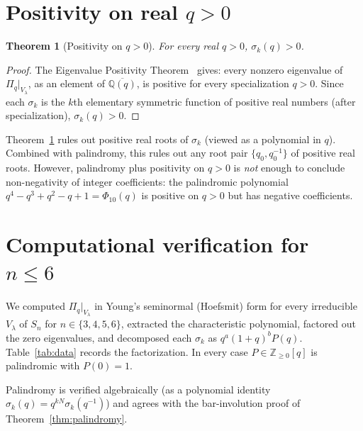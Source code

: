 \documentclass[11pt]{article}
\newtheorem{theorem}{Theorem}
\theoremstyle{definition}
\newcommand{\Pq}{\Pi_q}
\newcommand{\Z}{\mathbb{Z}}
\newcommand{\Q}{\mathbb{Q}}
\begin{document}
\section{Positivity on real \boldmath$q>0$}

\begin{theorem}[Positivity on $q>0$]\label{thm:realposivity}
For every real $q>0$, $\sigma_k(q)>0$.
\end{theorem}
\begin{proof}
The Eigenvalue Positivity Theorem~\cite{clio2026eigenvaluepositivity}
gives: every nonzero eigenvalue of $\Pq|_{V_\lambda}$, as an element of
$\overline{\Q(q)}$, is positive for every specialization $q>0$. Since
each $\sigma_k$ is the $k$th elementary symmetric function of positive
real numbers (after specialization), $\sigma_k(q)>0$.
\end{proof}

Theorem~\ref{thm:realposivity} rules out positive real roots of
$\sigma_k$ (viewed as a polynomial in $q$). Combined with palindromy,
this rules out any root pair $\{q_0, q_0^{-1}\}$ of positive real roots.
However, palindromy plus positivity on $q>0$ is \emph{not} enough to
conclude non-negativity of integer coefficients: the palindromic
polynomial $q^4-q^3+q^2-q+1=\Phi_{10}(q)$ is positive on $q>0$ but has
negative coefficients.

\section{Computational verification for \boldmath$n\le 6$}

We computed $\Pq|_{V_\lambda}$ in Young's seminormal (Hoefsmit) form
for every irreducible $V_\lambda$ of $S_n$ for $n\in\{3,4,5,6\}$,
extracted the characteristic polynomial, factored out the zero
eigenvalues, and decomposed each $\sigma_k$ as
$q^a(1+q)^bP(q)$. Table~\ref{tab:data} records the factorization. In
every case $P\in\Z_{\ge 0}[q]$ is palindromic with $P(0)=1$.

Palindromy is verified algebraically (as a polynomial identity
$\sigma_k(q)=q^{kN}\sigma_k(q^{-1})$) and agrees with the bar-involution
proof of Theorem~\ref{thm:palindromy}.
\end{document}
